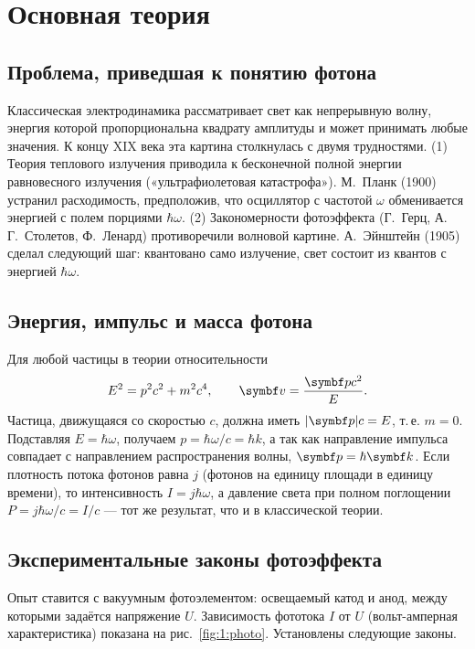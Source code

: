 \section{Основная теория}

\subsection{Проблема, приведшая к понятию фотона}

Классическая электродинамика рассматривает свет как непрерывную волну, энергия которой
пропорциональна квадрату амплитуды и может принимать любые значения. К концу XIX века эта
картина столкнулась с двумя трудностями. (1) Теория теплового излучения приводила к
бесконечной полной энергии равновесного излучения («ультрафиолетовая катастрофа»).
М.~Планк (1900) устранил расходимость, предположив, что осциллятор с частотой $\omega$
обменивается энергией с полем порциями $\hbar\omega$. (2) Закономерности фотоэффекта
(Г.~Герц, А.\,Г.~Столетов, Ф.~Ленард) противоречили волновой картине. А.~Эйнштейн (1905)
сделал следующий шаг: квантовано само излучение, свет состоит из квантов с энергией $\hbar\omega$.

\subsection{Энергия, импульс и масса фотона}

Для любой частицы в теории относительности
\begin{equation}\label{eq:1:Ep}
  E^2=p^2c^2+m^2c^4,\qquad \vect v=\frac{\vect pc^2}{E}.
\end{equation}
Частица, движущаяся со скоростью $c$, должна иметь $|\vect p|c=E$, т.\,е. $m=0$. Подставляя
$E=\hbar\omega$, получаем $p=\hbar\omega/c=\hbar k$, а так как направление импульса совпадает с
направлением распространения волны, $\vect p=\hbar\vect k$. Если плотность потока фотонов
равна $j$ (фотонов на единицу площади в единицу времени), то интенсивность $I=j\hbar\omega$, а
давление света при полном поглощении $P=j\hbar\omega/c=I/c$ — тот же результат, что и в
классической теории.

\subsection{Экспериментальные законы фотоэффекта}

Опыт ставится с вакуумным фотоэлементом: освещаемый катод и анод, между которыми задаётся
напряжение $U$. Зависимость фототока $I$ от $U$ (вольт-амперная характеристика) показана на
рис.~\ref{fig:1:photo}. Установлены следующие законы.

